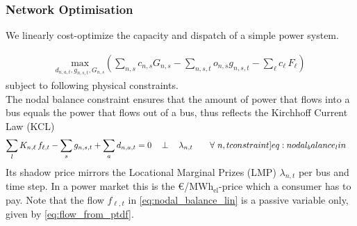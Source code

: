\documentclass[11pt]{article}
\newcommand{\generation}[1][n]{g_{#1,s,t}}
\newcommand{\capacityGeneration}{G_{n,s}}
\newcommand{\capacityFlow}{F_{\ell}}
\newcommand{\capexGeneration}{c_{n,s}}
\newcommand{\capexFlow}{c_{\ell}}
\newcommand{\opexGeneration}[1][n]{o_{#1,s}}
\newcommand{\demand}[1][n]{d_{#1,a,t}}
\newcommand{\utility}{U_{n,a,t}}
\newcommand{\incidence}[1][n]{K_{#1,\ell}}
\newcommand{\lmp}[1][n]{\lambda_{#1,t}}
\newcommand{\flow}{f_{\ell,t}}
\newcommand{\megawatthour}{MWh$_\text{el}$}
\newcommand{\resultsin}[1]{\hspace{12pt} \bot  \hspace{12pt} #1}
\newcommand{\Forall}[1]{\hspace{20pt} \forall \,\, #1 }
\begin{document}
\subsubsection*{Network Optimisation}

% 
% 

We linearly cost-optimize the capacity and dispatch of a simple power system. 

\begin{align}
    \underset{\demand, \generation, \capacityGeneration}{\text{max}}
    \left(\sum_{n,s} \capexGeneration \capacityGeneration - \sum_{n, s, t} \opexGeneration \generation - \sum_{\ell} \capexFlow \, \capacityFlow \right) \label{eq:minisation}
\end{align}
subject to following physical constraints. 
\\


The nodal balance constraint ensures that the amount of power that flows into a bus equals the power that flows out of a bus, thus reflects the Kirchhoff Current Law (KCL)
\begin{align}
    \sum_l \incidence \, \flow - \sum_s \generation + \sum_a \demand &= 0 \resultsin{\lmp} \Forall{n,t}
    \label[constraint]{eq:nodal_balance_lin}
\end{align}
Its shadow price mirrors the Locational Marginal Prizes (LMP) $\lmp$ per bus and time step. In a power market this is the \euro/\megawatthour-price which a consumer has to pay. Note that the flow $\flow$ in \cref{eq:nodal_balance_lin} is a passive variable only, given by \cref{eq:flow_from_ptdf}.\\
\end{document}
